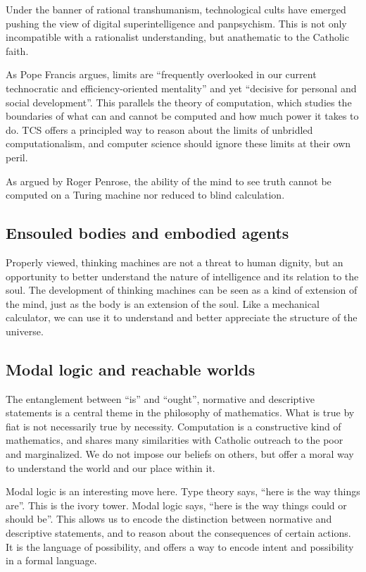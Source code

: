 \documentclass[sigplan,nonacm]{acmart}\settopmatter{printfolios=false,printccs=false,printacmref=false}
\begin{document}
  Under the banner of rational transhumanism, technological cults have emerged pushing the view of digital superintelligence and panpsychism. This is not only incompatible with a rationalist understanding, but anathematic to the Catholic faith.

  As Pope Francis argues, limits are ``frequently overlooked in our current technocratic and efficiency-oriented mentality'' and yet ``decisive for personal and social development''. This parallels the theory of computation, which studies the boundaries of what can and cannot be computed and how much power it takes to do. TCS offers a principled way to reason about the limits of unbridled computationalism, and computer science should ignore these limits at their own peril.

  As argued by Roger Penrose, the ability of the mind to see truth cannot be computed on a Turing machine nor reduced to blind calculation.

  \subsection{Ensouled bodies and embodied agents}

  Properly viewed, thinking machines are not a threat to human dignity, but an opportunity to better understand the nature of intelligence and its relation to the soul. The development of thinking machines can be seen as a kind of extension of the mind, just as the body is an extension of the soul. Like a mechanical calculator, we can use it to understand and better appreciate the structure of the universe.

  \subsection{Modal logic and reachable worlds}

  The entanglement between ``is'' and ``ought'', normative and descriptive statements is a central theme in the philosophy of mathematics. What is true by fiat is not necessarily true by necessity. Computation is a constructive kind of mathematics, and shares many similarities with Catholic outreach to the poor and marginalized. We do not impose our beliefs on others, but offer a moral way to understand the world and our place within it.

  Modal logic is an interesting move here. Type theory says, ``here is the way things are''. This is the ivory tower. Modal logic says, ``here is the way things could or should be''. This allows us to encode the distinction between normative and descriptive statements, and to reason about the consequences of certain actions. It is the language of possibility, and offers a way to encode intent and possibility in a formal language.

  
\end{document}
